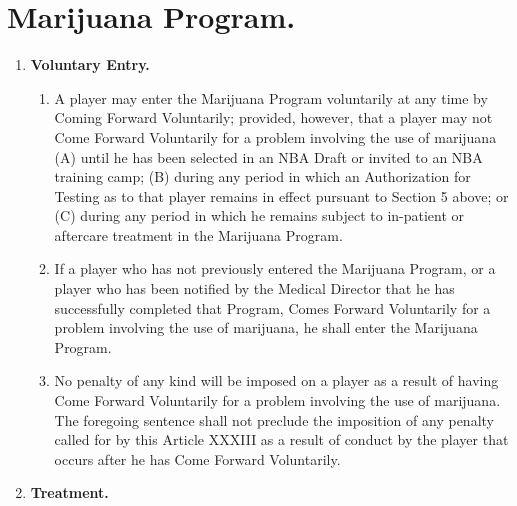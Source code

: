 \documentclass[
]{book}
\providecommand{\tightlist}{%
  \setlength{\itemsep}{0pt}\setlength{\parskip}{0pt}}
\begin{document}
\hypertarget{marijuana-program.}{%
\section{Marijuana Program.}\label{marijuana-program.}}

\begin{enumerate}
\def\labelenumi{(\alph{enumi})}
\tightlist
\item
  \textbf{Voluntary Entry.}

  \begin{enumerate}
  \def\labelenumii{(\roman{enumii})}
  \tightlist
  \item
    A player may enter the Marijuana Program voluntarily at any time by Coming Forward Voluntarily; provided, however, that a player may not Come Forward Voluntarily for a problem involving the use of marijuana (A) until he has been selected in an NBA Draft or invited to an NBA training camp; (B) during any period in which an Authorization for Testing as to that player remains in effect pursuant to Section 5 above; or (C) during any period in which he remains subject to in-patient or aftercare treatment in the Marijuana Program.
  \item
    If a player who has not previously entered the Marijuana Program, or a player who has been notified by the Medical Director that he has successfully completed that Program, Comes Forward Voluntarily for a problem involving the use of marijuana, he shall enter the Marijuana Program.
  \item
    No penalty of any kind will be imposed on a player as a result of having Come Forward Voluntarily for a problem involving the use of marijuana. The foregoing sentence shall not preclude the imposition of any penalty called for by this Article XXXIII as a result of conduct by the player that occurs after he has Come Forward Voluntarily.
  \end{enumerate}
\item
  \textbf{Treatment.}


\end{enumerate}
\end{document}
